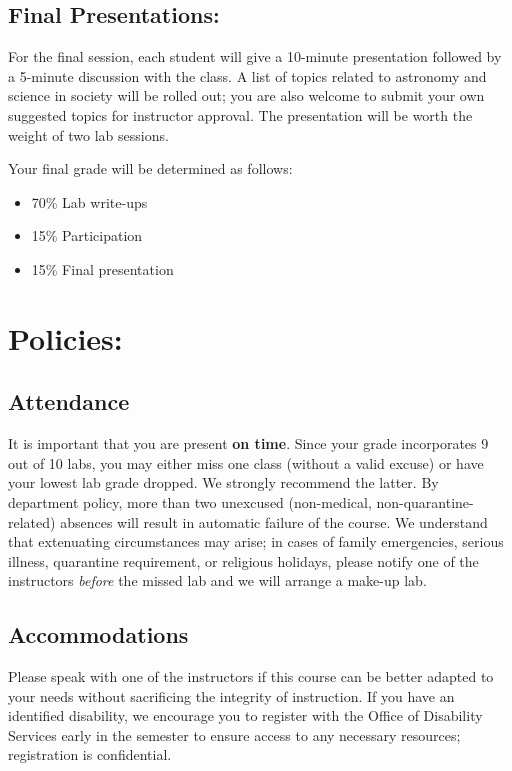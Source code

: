 \documentclass[11pt]{article}
\begin{document}
\subsection*{Final Presentations:}
\noindent For the final session, each student will give a 10-minute presentation followed by a 5-minute discussion with the class. A list of topics related to astronomy and science in society will be rolled out; you are also welcome to submit your own suggested topics for instructor approval. The presentation will be worth the weight of two lab sessions.  \\ 

\bigskip

\noindent Your final grade will be determined as follows:
\begin{itemize}
\item 70\% Lab write-ups 
\item 15\% Participation 
\item 15\% Final presentation \\
\end{itemize}
 
 
\section*{Policies:}
 
\subsection*{Attendance}
 
It is important that you are present \textbf{on time}. Since your grade incorporates 9 out of 10 labs, you may either miss one class (without a valid excuse) or have your lowest lab grade dropped. We strongly recommend the latter. By department policy, more than two unexcused (non-medical, non-quarantine-related) absences will result in automatic failure of the course. We understand that extenuating circumstances may arise; in cases of family emergencies, serious illness, quarantine requirement, or religious holidays, please notify one of the instructors \textit{before} the missed lab and we will arrange a make-up lab. 
 
\subsection*{Accommodations}
Please speak with one of the instructors if this course can be better adapted to your needs without sacrificing the integrity of instruction. If you have an identified disability, we encourage you to register with the Office of Disability Services early in the semester to ensure access to any necessary resources; registration is confidential.
 
\end{document}
